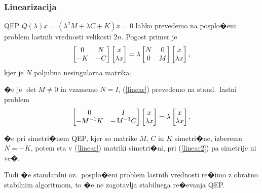\documentclass[9pt]{beamer}
\begin{document}
\begin{frame}
\frametitle{Linearizacija}

QEP $Q(\lambda)x=(\lambda^2 M+\lambda C+K)x=0$
lahko prevedemo na \alert{posplo�eni
problem lastnih vrednosti} velikosti $2n$. Pogost primer je 
\begin{equation}\left[\begin{matrix}0 & N\cr -K & -C\end{matrix}\right]
                        \left[\begin{matrix}x \cr \lambda x\end{matrix}\right]=\lambda
   \left[\begin{matrix}N & 0\cr 0 & M\end{matrix}\right]
   \left[\begin{matrix}x \cr \lambda x\end{matrix}\right],\label{linear}
\end{equation}
kjer je $N$ poljubna nesingularna matrika.\vspace{1em}\pause

�e je $\det M\ne 0$ in vzamemo $N=I$, (\ref{linear})
prevedemo na \alert{stand.~lastni problem} 
\begin{equation}
  \left[\begin{matrix}0 & I \cr -M^{-1}K & -M^{-1}C\end{matrix}\right]
  \left[\begin{matrix}x \cr \lambda x\end{matrix}\right]=\lambda
   \left[\begin{matrix}x \cr \lambda x\end{matrix}\right].
  \label{linear2}
\end{equation}\pause

�e pri simetri�nem QEP, kjer so
matrike $M$, $C$ in $K$ simetri�ne, izberemo $N=-K$, potem sta v
(\ref{linear}) matriki simetri�ni, pri (\ref{linear2}) pa simetrije
ni ve�.\vspace{1em}

Tudi �e standardni oz.~posplo�eni problem lastnih vrednosti re�imo 
z obratno stabilnim algoritmom,  to �e \alert{ne} zagotavlja
stabilnega re�evanja QEP. 

\end{frame}
\end{document}
